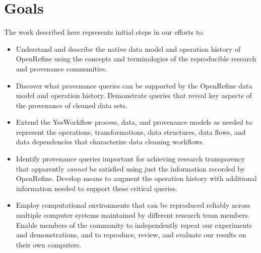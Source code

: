 \section{Goals}

The work described here represents initial steps in our efforts to:

\begin{itemize}[label=\raisebox{0.25ex}{\tiny$\bullet$}]

\item Understand and describe the native data model and operation history of OpenRefine using the concepts and terminologies of the reproducible research and provenance communities.

\item Discover what provenance queries can be supported by the OpenRefine data model and operation history.  Demonstrate queries that reveal key aspects of the provenance of cleaned data sets.

\item Extend the YesWorkflow \cite{mcphillips2015yesworkflowa, yw-website} process, data, and provenance models as needed to represent the operations, transformations, data structures, data flows, and data dependencies that characterize data cleaning workflows.  


\item Identify provenance queries important for achieving research transparency that apparently \emph{cannot} be satisfied using just the information recorded by OpenRefine. Develop means to augment the operation history with additional information needed to support these critical queries.

\item Employ computational environments that can be reproduced reliably across multiple computer systems maintained by different research team members. Enable members of the community to independently repeat our experiments and demonstrations, and to reproduce, review, and evaluate our results on their own computers.

\end{itemize}
